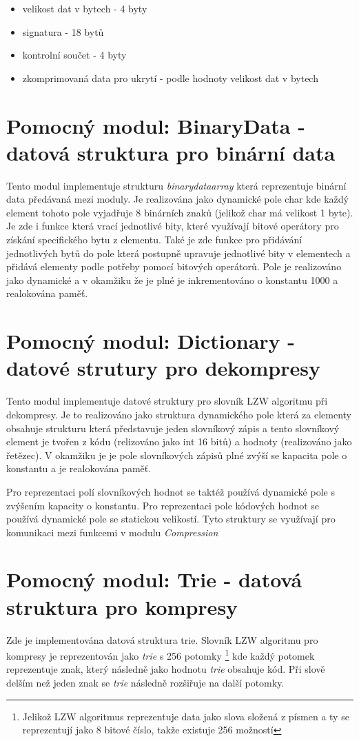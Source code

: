 \documentclass[12pt]{report}
\begin{document}
    \begin{itemize}
        \item velikost dat v bytech - 4 byty
        \item signatura - 18 bytů
        \item kontrolní součet - 4 byty
        \item zkomprimovaná data pro ukrytí - podle hodnoty velikost dat v bytech
    \end{itemize}


    \section{Pomocný modul: BinaryData - datová struktura pro binární data}
    Tento modul implementuje strukturu \textit{binarydataarray} která reprezentuje binární data předávaná mezi moduly. Je realizována jako dynamické pole char kde každý element tohoto pole vyjadřuje 8 binárních znaků (jelikož char má velikost 1 byte). Je zde i funkce která vrací jednotlivé bity, které využívají bitové operátory pro získání specifického bytu z elementu. Také je zde funkce pro přidávání jednotlivých bytů do pole která postupně upravuje jednotlivé bity v elementech a přidává elementy podle potřeby pomocí bitových operátorů. Pole je realizováno jako dynamické a v okamžiku že je plné je inkrementováno o konstantu 1000 a realokována paměť.


    \section{Pomocný modul: Dictionary - datové strutury pro dekompresy}
    Tento modul implementuje datové struktury pro slovník LZW algoritmu při dekompresy.
    Je to realizováno jako struktura dynamického pole která za elementy obsahuje strukturu která představuje jeden slovníkový zápis a tento slovníkový element je tvořen z kódu (relizováno jako int 16 bitů) a hodnoty (realizováno jako řetězec). V okamžiku je je pole slovníkových zápisů plné zvýší se kapacita pole o konstantu a je realokována paměť.

    Pro reprezentaci polí slovníkových hodnot se taktéž používá dynamické pole s zvýšením kapacity o konstantu.
    Pro reprezentaci pole kódových hodnot se používá dynamické pole se statickou velikostí.
    Tyto struktury se využívají pro komunikaci mezi funkcemi v modulu \textit{Compression}

\section{Pomocný modul: Trie - datová struktura pro kompresy}
Zde je implementována datová struktura trie. 
Slovník LZW algoritmu pro kompresy je reprezentován jako \textit{trie} s 256 potomky \footnote{Jelikož LZW algoritmus reprezentuje data jako slova složená z písmen a ty se reprezentují jako 8 bitové číslo, takže existuje 256 možností} kde každý potomek reprezentuje znak, který následně jako hodnotu \textit{trie} obsahuje kód. Při slově delším než jeden znak se \textit{trie} následně rozšiřuje na další potomky.
\end{document}
